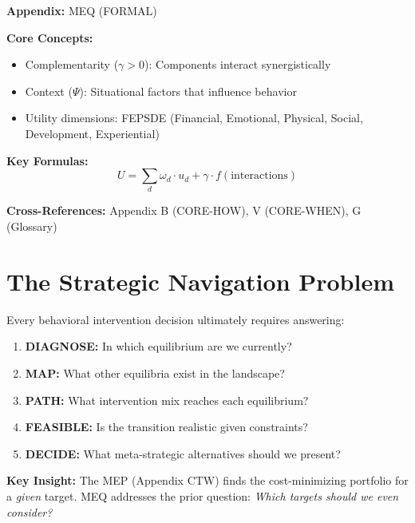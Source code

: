 \begin{tcolorbox}[colback=blue!5!white, colframe=blue!75!black,
    title=Quick Reference: Multiple Equilibria \& Strategic Navigation (MEQ)]

\textbf{Appendix:} MEQ (FORMAL)

\textbf{Core Concepts:}
\begin{itemize}[nosep]
\item Complementarity ($\gamma > 0$): Components interact synergistically
\item Context ($\Psi$): Situational factors that influence behavior
\item Utility dimensions: FEPSDE (Financial, Emotional, Physical, Social, Development, Experiential)
\end{itemize}

\textbf{Key Formulas:}
\begin{equation}
U = \sum_d \omega_d \cdot u_d + \gamma \cdot f(\text{interactions})
\end{equation}

\textbf{Cross-References:} Appendix B (CORE-HOW), V (CORE-WHEN), G (Glossary)
\end{tcolorbox}



\section{The Strategic Navigation Problem}
\label{sec:meq-problem}

\begin{tcolorbox}[colback=blue!5!white, colframe=blue!75!black,
    title=The Five Questions of Strategic Navigation]

Every behavioral intervention decision ultimately requires answering:

\begin{enumerate}
    \item \textbf{DIAGNOSE:} In which equilibrium are we currently?
    \item \textbf{MAP:} What other equilibria exist in the landscape?
    \item \textbf{PATH:} What intervention mix reaches each equilibrium?
    \item \textbf{FEASIBLE:} Is the transition realistic given constraints?
    \item \textbf{DECIDE:} What meta-strategic alternatives should we present?
\end{enumerate}

\textbf{Key Insight:} The MEP (Appendix CTW) finds the cost-minimizing portfolio
for a \textit{given} target. MEQ addresses the prior question: \textit{Which
targets should we even consider?}

\end{tcolorbox}

